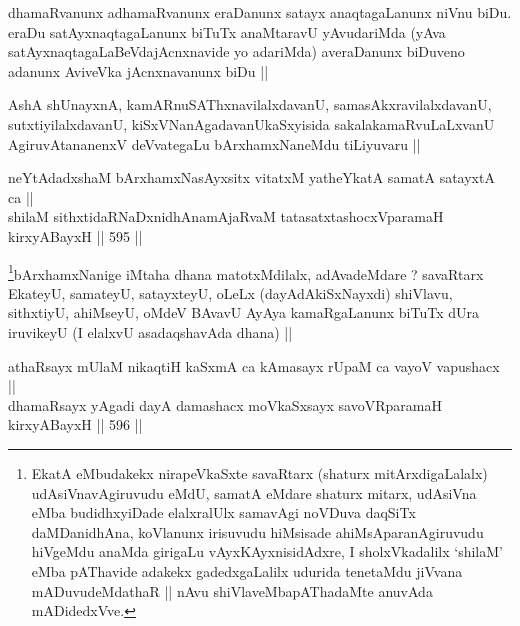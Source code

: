 \begin{artha}
dhamaRvanunx adhamaRvanunx eraDanunx satayx anaqtagaLanunx niVnu
biDu. eraDu satAyxnaqtagaLanunx biTuTx anaMtaravU yAvudariMda (yAva
satAyxnaqtagaLaBeVdajAcnxnavide yo adariMda) averaDanunx biDuveno
adanunx AviveVka jAcnxnavanunx biDu ||
\end{artha}

\begin{artha}
AshA shUnayxnA, kamARnuSAThxnavilalxdavanU, samasAkxravilalxdavanU,
sutxtiyilalxdavanU, kiSxVNanAgadavanUkaSxyisida sakalakamaRvuLaLxvanU
AgiruvAtananenxV deVvategaLu bArxhamxNaneMdu tiLiyuvaru ||
\end{artha}


\begin{shl}
neYtAdadxshaM bArxhamxNasAyxsitx vitatxM yatheYkatA samatA satayxtA ca || \\
shilaM sithxtidaRNaDxnidhAnamAjaRvaM tatasatxtashocxVparamaH kirxyABayxH ||  595 ||  
\end{shl}

\begin{artha}
\footnote{EkatA eMbudakekx nirapeVkaSxte savaRtarx (shaturx
  mitArxdigaLalalx) udAsiVnavAgiruvudu eMdU, samatA eMdare shaturx
  mitarx, udAsiVna eMba budidhxyiDade elalxralUlx samavAgi noVDuva
  daqSiTx daMDanidhAna, koVlanunx irisuvudu hiMsisade
  ahiMsAparanAgiruvudu hiVgeMdu anaMda girigaLu vAyxKAyxnisidAdxre, I
  sholxVkadalilx `shilaM' eMba pAThavide adakekx gadedxgaLalilx
  udurida tenetaMdu jiVvana mADuvudeMdathaR || nAvu
  shiVlaveMbapAThadaMte anuvAda mADidedxVve.}bArxhamxNanige iMtaha dhana matotxMdilalx, adAvadeMdare ?
savaRtarx EkateyU, samateyU, satayxteyU, oLeLx (dayAdAkiSxNayxdi)
shiVlavu, sithxtiyU, ahiMseyU, oMdeV BAvavU AyAya kamaRgaLanunx biTuTx
dUra iruvikeyU  (I elalxvU asadaqshavAda dhana) ||
\end{artha}


\begin{shl}
athaRsayx mUlaM nikaqtiH kaSxmA ca kAmasayx rUpaM ca vayoV vapushacx || \\
dhamaRsayx yAgadi dayA damashacx moVkaSxsayx savoVRparamaH kirxyABayxH ||  596 ||  
\end{shl}

